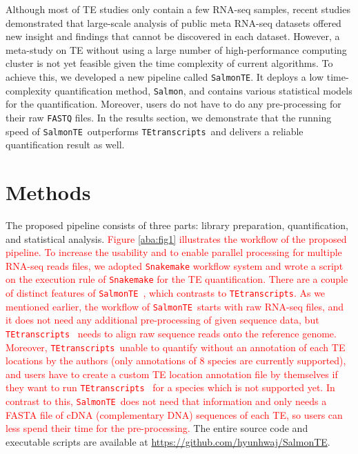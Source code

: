 \documentclass[wsdraft]{ws-procs11x85}
\newcommand{\TEtranscripts}{\texttt{TEtranscripts}}
\newcommand{\SalmonTE}{\texttt{SalmonTE}}
\begin{document}
Although most of TE studies only contain a few RNA-seq samples, recent studies demonstrated that large-scale analysis of public meta RNA-seq datasets offered new insight and findings that cannot be discovered in each dataset. \cite{nellore2016human} However, a meta-study on TE without using a large number of high-performance computing cluster is not yet feasible given the time complexity of current algorithms.  To achieve this, we developed a new pipeline called \SalmonTE. It deploys a low time-complexity quantification method, \verb|Salmon|\cite{patro2017salmon}, and contains various statistical models for the quantification. Moreover, users do not have to do any pre-processing for their raw \verb|FASTQ| files. 
In the results section, we demonstrate that the running speed of \SalmonTE~outperforms \TEtranscripts~and delivers a reliable quantification result as well.

\section{Methods}

The proposed pipeline consists of three parts: library preparation, quantification, and statistical analysis.
\textcolor{red}{
Figure \ref{aba:fig1} illustrates the workflow of the proposed pipeline.
To increase the usability and to enable parallel processing for multiple RNA-seq reads files, we adopted \texttt{Snakemake} workflow system and wrote a script on the execution rule of \texttt{Snakemake} for the TE quantification.\cite{koster2012snakemake}
}
\textcolor{red}{
There are a couple of distinct features of \SalmonTE~, which contrasts to \TEtranscripts.
As we mentioned earlier, the workflow of \SalmonTE~starts with raw RNA-seq files, and it does not need any additional pre-processing of given sequence data, but \TEtranscripts~ needs to align raw sequence reads onto the reference genome. Moreover, \TEtranscripts~unable to quantify without an annotation of each TE locations by the authors (only annotations of 8 species are currently supported), and users have to create a custom TE location annotation file by themselves if they want to run \TEtranscripts~ for a species which is not supported yet. In contrast to this, \SalmonTE~does not need that information and only needs a FASTA file of cDNA (complementary DNA) sequences of each TE, so users can less spend their time for the pre-processing. 
}
The entire source code and executable scripts are available at \url{https://github.com/hyunhwaj/SalmonTE}. 
\end{document}
